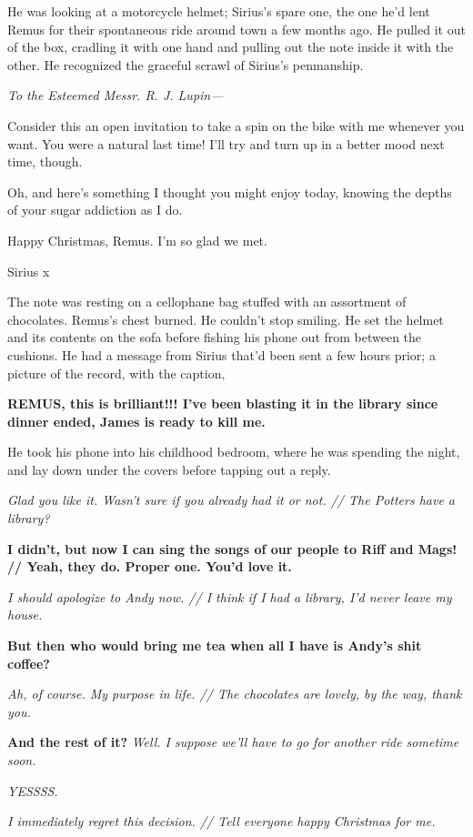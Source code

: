 He was looking at a motorcycle helmet; Sirius’s spare one, the one he’d lent Remus for their spontaneous ride around town a few months ago. He pulled it out of the box, cradling it with one hand and pulling out the note inside it with the other. He recognized the graceful scrawl of Sirius’s penmanship.

{\it To the Esteemed Messr. R. J. Lupin—

Consider this an open invitation to take a spin on the bike with me whenever you want. You were a natural last time! I’ll try and turn up in a better mood next time, though.

Oh, and here’s something I thought you might enjoy today, knowing the depths of your sugar addiction as I do.

Happy Christmas, Remus. I’m so glad we met.

Sirius x}

The note was resting on a cellophane bag stuffed with an assortment of chocolates. Remus’s chest burned. He couldn’t stop smiling. He set the helmet and its contents on the sofa before fishing his phone out from between the cushions. He had a message from Sirius that’d been sent a few hours prior; a picture of the record, with the caption,

\textbf{REMUS, this is brilliant!!! I’ve been blasting it in the library since dinner ended, James is ready to kill me.}

He took his phone into his childhood bedroom, where he was spending the night, and lay down under the covers before tapping out a reply.

\textit{Glad you like it. Wasn’t sure if you already had it or not. // The Potters have a library?}

\textbf{I didn’t, but now I can sing the songs of our people to Riff and Mags! // Yeah, they do. Proper one. You’d love it.}

\textit{I should apologize to Andy now. // I think if I had a library, I’d never leave my house.}

\textbf{But then who would bring me tea when all I have is Andy’s shit coffee?}

\textit{Ah, of course. My purpose in life. // The chocolates are lovely, by the way, thank you.}

\textbf{And the rest of it?
}
\textit{Well. I suppose we’ll have to go for another ride sometime soon.}

\textit{YESSSS.}

\textit{I immediately regret this decision. // Tell everyone happy Christmas for me.}

